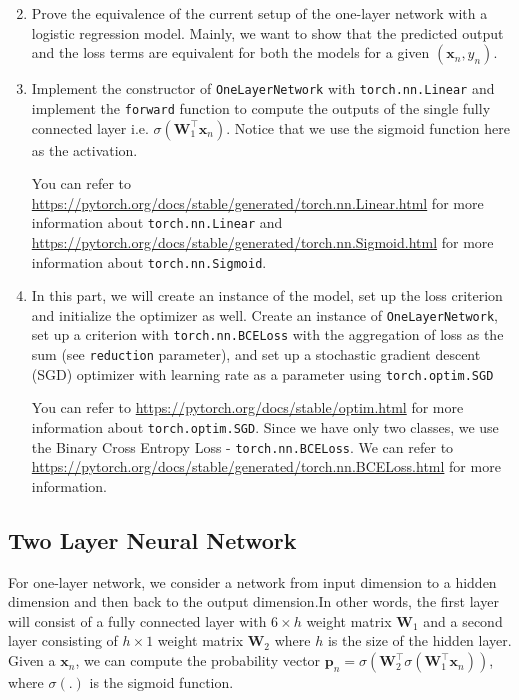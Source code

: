 \begin{enumerate}
\setcounter{enumi}{1}

\item {}
Prove the equivalence of the current setup of the one-layer network with a logistic regression model. Mainly, we want to show that the predicted output and the loss terms are equivalent for both the models for a given $(\mathbf{x}_n, y_n)$.

\item {}
Implement the constructor of \verb|OneLayerNetwork| with \verb|torch.nn.Linear| and implement the \verb|forward| function to compute the outputs of the single fully connected layer i.e. $\sigma(\mathbf{W}_1^\top \mathbf{x}_n)$. Notice that we use the sigmoid function here as the activation.

You can refer to \url{https://pytorch.org/docs/stable/generated/torch.nn.Linear.html} for more information about \verb|torch.nn.Linear| and \url{https://pytorch.org/docs/stable/generated/torch.nn.Sigmoid.html} for more information about \verb|torch.nn.Sigmoid|.

\item {}
In this part, we will create an instance of the model, set up the loss criterion and initialize the optimizer as well. Create an instance of \verb|OneLayerNetwork|, set up a criterion with \verb|torch.nn.BCELoss| with the aggregation of loss as the sum (see \verb|reduction| parameter), and set up a stochastic gradient descent (SGD) optimizer with learning rate as a parameter using \verb|torch.optim.SGD| 

You can refer to \url{https://pytorch.org/docs/stable/optim.html} for more information about \verb|torch.optim.SGD|. Since we have only two classes, we use the Binary Cross Entropy Loss - \verb|torch.nn.BCELoss|. We can refer to \url{https://pytorch.org/docs/stable/generated/torch.nn.BCELoss.html} for more information.

\end{enumerate}

\subsection{Two Layer Neural Network }

For one-layer network, we consider a network from input dimension to a hidden dimension and then back to the output dimension.In other words, the first layer will consist of a fully connected layer with $6 \times h$ weight matrix $\mathbf{W}_1$ and a second layer consisting of $h \times 1$ weight matrix $\mathbf{W}_2$ where $h$ is the size of the hidden layer. Given a $\mathbf{x}_n$, we can compute the probability vector $\mathbf{p}_n = \sigma(\mathbf{W}_2^\top \sigma(\mathbf{W}_1^\top \mathbf{x}_n))$, where $\sigma(.)$ is the sigmoid function.

